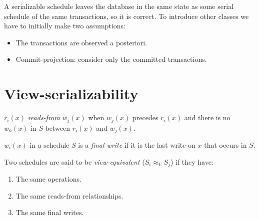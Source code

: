 \documentclass[12pt, a4paper]{report}
\newtheorem[style=M,bodystyle=\normalfont]{theorem}{Theorem}
\newtheorem[style=M,bodystyle=\normalfont]{corollary}{Corollary}
\newtheorem[style=M,bodystyle=\normalfont]{lemma}{Lemma}
\newtheorem[style=M,bodystyle=\normalfont]{definition}{Definition}
\begin{document}
    A serializable schedule leaves the database in the same state as some serial schedule of the same transactions, so it is correct. To introduce other classes we have to initially
    make two assumptions: 
    \begin{itemize}
        \item The transactions are observed a posteriori. 
        \item Commit-projection: consider only the committed transactions. 
    \end{itemize}

    \section{View-serializability}
    \begin{definition}
        $r_i(x)$ \emph{reads-from} $w_j(x)$ when  $w_j(x)$  precedes  $r_i(x)$ and there is no  $w_k(x)$ in $S$ between  $r_i(x)$  and  $w_j(x)$. 
        
        $w_i(x)$ in a schedule $S$ is a \emph{final write} if it is the last write on $x$ that occurs in $S$. 


        Two schedules are said to be \emph{view-equivalent} ($S_i \approx_V S_j$) if they have:
        \begin{enumerate}
            \item The same operations. 
            \item The same reads-from relationships.
            \item The same final writes. 
        \end{enumerate}
    \end{definition}
\end{document}

